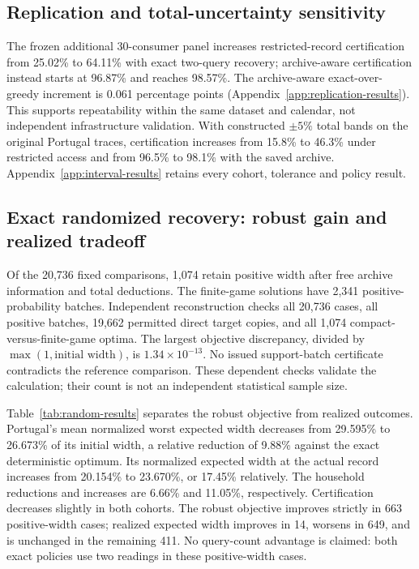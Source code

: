 \documentclass[12pt]{article}
\begin{document}
\subsection{Replication and total-uncertainty sensitivity}
The frozen additional 30-consumer panel increases restricted-record
certification from 25.02\% to 64.11\% with exact two-query recovery;
archive-aware certification instead starts at 96.87\% and reaches 98.57\%.
The archive-aware exact-over-greedy increment is 0.061 percentage points
(Appendix~\ref{app:replication-results}). This supports repeatability within
the same dataset and calendar, not independent infrastructure validation.
With constructed $\pm5\%$ total bands on the original Portugal traces,
certification increases from 15.8\% to 46.3\% under restricted access and
from 96.5\% to 98.1\% with the saved archive. Appendix~\ref{app:interval-results}
retains every cohort, tolerance and policy result.


\subsection{Exact randomized recovery: robust gain and realized tradeoff}
\label{sec:random-results}
Of the 20,736 fixed comparisons, 1,074 retain positive width after free
archive information and total deductions. The finite-game solutions have
2,341 positive-probability batches. Independent reconstruction checks all
20,736 cases, all positive batches, 19,662 permitted direct target copies,
and all 1,074 compact-versus-finite-game optima. The largest objective
discrepancy, divided by $\max(1,\text{initial width})$, is
$1.34\times10^{-13}$. No issued support-batch certificate contradicts
the reference comparison. These dependent checks validate the calculation;
their count is not an independent statistical sample size.

Table~\ref{tab:random-results} separates the robust objective from realized
outcomes. Portugal's mean normalized worst expected width decreases from
29.595\% to 26.673\% of its initial width, a relative reduction of 9.88\%
against the exact deterministic optimum. Its normalized expected width at
the actual record increases from 20.154\% to 23.670\%, or 17.45\% relatively.
The household reductions and increases are 6.66\% and 11.05\%, respectively.
Certification decreases slightly in both cohorts. The robust objective
improves strictly in 663 positive-width cases; realized expected width
improves in 14, worsens in 649, and is unchanged in the remaining 411.
No query-count advantage is claimed: both exact policies use two readings
in these positive-width cases.
\end{document}
